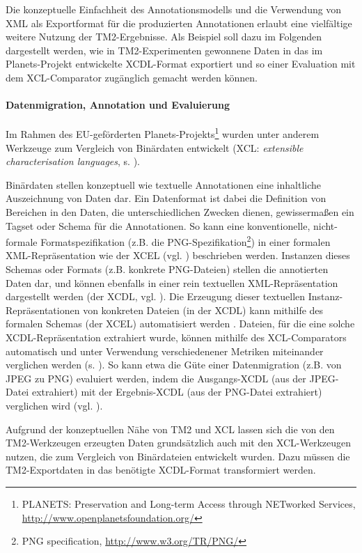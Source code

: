 \documentclass[abstracton, 12pt]{scrartcl}
\begin{document}
Die konzeptuelle Einfachheit des Annotationsmodells und die Verwendung von XML als Exportformat für die produzierten Annotationen erlaubt eine vielfältige weitere Nutzung der TM2-Ergebnisse. Als Beispiel soll dazu im Folgenden dargestellt werden, wie in TM2-Experimenten gewonnene Daten in das im Planets-Projekt entwickelte XCDL-Format exportiert und so einer Evaluation mit dem XCL-Comparator zugänglich gemacht werden können.

\paragraph{Datenmigration, Annotation und Evaluierung}

Im Rahmen des EU-geförderten Planets-Pro\-jekts\footnote{PLANETS: Preservation and Long-term Access through NETworked Services, \url{http://www.openplanetsfoundation.org/}} wurden unter anderem Werkzeuge zum Vergleich von Binärdaten entwickelt (XCL: \emph{extensible characterisation languages}, s. \citealt{Thaller2009}).

Binärdaten stellen konzeptuell wie textuelle Annotationen eine inhaltliche Auszeichnung von Daten dar. Ein Datenformat ist dabei die Definition von Bereichen in den Daten, die  unterschiedlichen Zwecken dienen, gewissermaßen ein Tagset oder Schema für die Annotationen. So kann eine konventionelle, nicht-formale Formatspezifikation (z.B. die PNG-Spezifikation\footnote{PNG specification, \url{http://www.w3.org/TR/PNG/}}) in einer formalen XML-Repräsentation wie der XCEL (vgl. \citealt{SchnasseEtAl2009}) beschrieben werden. Instanzen dieses Schemas oder Formats (z.B. konkrete PNG-Dateien) stellen die annotierten Daten dar, und können ebenfalls in einer rein textuellen XML-Repräsentation dargestellt werden (der XCDL, vgl. \citealt{BeylEtAl2009}). Die Erzeugung dieser textuellen Instanz-Repräsentationen von konkreten Dateien (in der XCDL) kann mithilfe des formalen Schemas (der XCEL) automatisiert werden \citep{HeydeggerEtAl2009}. Dateien, für die eine solche XCDL-Repräsentation extrahiert wurde, können mithilfe des XCL-Comparators automatisch und unter Verwendung verschiedenener Metriken miteinander verglichen werden (s. \citealt[174]{HeydeggerEtAl2009}). So kann etwa die Güte einer Datenmigration (z.B. von JPEG zu PNG) evaluiert werden, indem die Ausgangs-XCDL (aus der JPEG-Datei extrahiert) mit der Ergebnis-XCDL (aus der PNG-Datei extrahiert) verglichen wird (vgl. \citealt{SchnasseEtAl2009}).

Aufgrund der konzeptuellen Nähe von TM2 und XCL lassen sich die von den TM2-Werkzeugen erzeugten Daten grundsätzlich auch mit den XCL-Werkzeugen nutzen, die zum Vergleich von Binärdateien entwickelt wurden. Dazu müssen die TM2-Exportdaten in das benötigte XCDL-Format transformiert werden.
\end{document}
